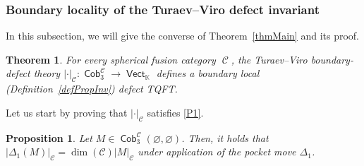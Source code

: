 \documentclass[10pt,a4paper]{amsart}
\DeclareMathOperator{\vect}{\mathsf{Vect}}
\DeclareMathOperator{\K}{\mathbb{K}}
\DeclareMathOperator{\Cob}{\mathsf{Cob}}
\DeclareMathOperator{\calc}{\mathcal{C}}
\numberwithin{equation}{section}
\newtheorem{Theorem}{Theorem}[section]
\newtheorem{Proposition}[Proposition]{Proposition}
\theoremstyle{definition}
\begin{document}
\subsubsection{Boundary locality of the Turaev--Viro defect invariant}
\label{subSecProof}
In this subsection, we will give the converse of Theorem~\ref{thmMain} and its proof.
\begin{Theorem}
 \label{thmMainTV}
 For every spherical fusion category $\calc$, the Turaev--Viro boundary-defect theory $| \cdot |_{\calc}\colon \Cob_3^{\calc} \rightarrow \vect_{\K}$ defines a boundary local {\rm (}Definition~{\rm \ref{defPropInv})} defect TQFT.
\end{Theorem}
Let us start by proving that $|\cdot|_{\calc}$ satisfies \ref{P1}.
\begin{Proposition}
 \label{propProp1TV}
 Let $M \in \Cob_3^{\mathcal{C}}(\varnothing, \varnothing)$. Then, it holds that $|\Delta_1(M)|_{\mathcal{C}} = \dim(\mathcal{C})|M|_{\mathcal{C}}$ under application of the pocket move $\Delta_1$.
\end{Proposition}
\end{document}
